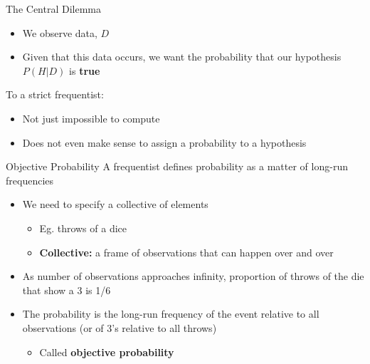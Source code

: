 \documentclass[12pt, block=fill]{beamer}
\begin{document}
\begin{frame}{The Central Dilemma}
  \begin{itemize}
      \item We observe data, $D$
      \item Given that this data occurs, we want the probability that our hypothesis $P(H|D)$ is \textbf{true}
  \end{itemize}
  
  To a strict frequentist:
  \begin{itemize}
      \item Not just impossible to compute
      \item Does not even make sense to assign a probability to a hypothesis
  \end{itemize}
\end{frame}



\begin{frame}{Objective Probability}
A frequentist defines probability as a matter of long-run frequencies
\begin{itemize}
    \item We need to specify a collective of elements
    \begin{itemize}
        \item Eg. throws of a dice
        \item \textbf{Collective:} a frame of observations that can happen over and over
    \end{itemize}
    \item As number of observations approaches infinity, proportion of throws of the die that show a 3 is 1/6
    \item The probability is the long-run frequency of the event relative to all observations (or of 3's relative to all throws)
    \begin{itemize}
        \item Called \textbf{objective probability}
    \end{itemize}
\end{itemize}
    
\end{frame}
\end{document}
